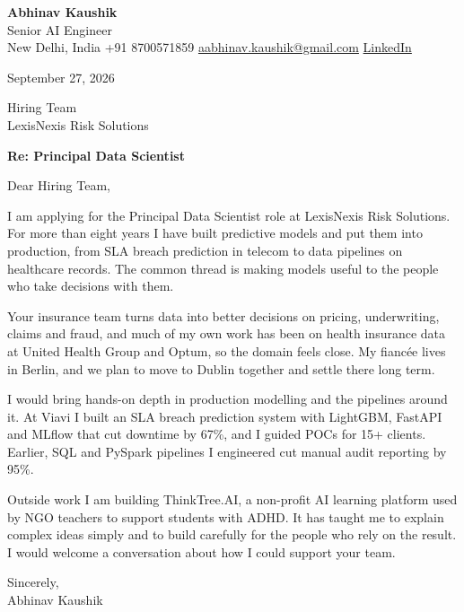 \documentclass[11pt,a4paper]{article}
\begin{document}
{\Large\bfseries Abhinav Kaushik}\\
Senior AI Engineer\\
New Delhi, India \textbar{} +91 8700571859 \textbar{} \href{mailto:aabhinav.kaushik@gmail.com}{aabhinav.kaushik@gmail.com} \textbar{} \href{https://www.linkedin.com/in/abhinav-kaushik10/}{LinkedIn}  

September 27, 2026

Hiring Team\\
LexisNexis Risk Solutions

\textbf{Re: Principal Data Scientist}

Dear Hiring Team,

I am applying for the Principal Data Scientist role at LexisNexis Risk Solutions. For more than eight years I have built predictive models and put them into production, from SLA breach prediction in telecom to data pipelines on healthcare records. The common thread is making models useful to the people who take decisions with them.

Your insurance team turns data into better decisions on pricing, underwriting, claims and fraud, and much of my own work has been on health insurance data at United Health Group and Optum, so the domain feels close. My fiancée lives in Berlin, and we plan to move to Dublin together and settle there long term.

I would bring hands-on depth in production modelling and the pipelines around it. At Viavi I built an SLA breach prediction system with LightGBM, FastAPI and MLflow that cut downtime by 67\%, and I guided POCs for 15+ clients. Earlier, SQL and PySpark pipelines I engineered cut manual audit reporting by 95\%.

Outside work I am building ThinkTree.AI, a non-profit AI learning platform used by NGO teachers to support students with ADHD. It has taught me to explain complex ideas simply and to build carefully for the people who rely on the result. I would welcome a conversation about how I could support your team.

Sincerely,\\[4pt]
Abhinav Kaushik
\end{document}
